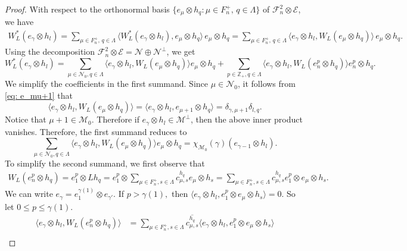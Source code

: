 \documentclass[12pt]{amsart}
\theoremstyle{definition}
\theoremstyle{remark}
\def \Z{\mathbb{Z}}
\newcommand{\cle}{\mathcal{E}}
\newcommand{\clm}{\mathcal{M}}
\newcommand{\cln}{\mathcal{N}}
\newcommand{\clf}{\mathcal{F}}
\newcommand{\ol}{\overline}
\numberwithin{equation}{section}
\begin{document}
\begin{proof}
With respect to the orthonormal basis $\{e_\mu \otimes h_q : \mu \in F_n^+,\, q \in \Lambda\}$
of
$\clf_n^2 \otimes \cle$, we have
\begin{align*}
W_L^*(e_\gamma \otimes h_l)
=
\sum_{\mu \in F_n^+,\, q \in \Lambda}
\langle W_L^*(e_\gamma \otimes h_l),
e_\mu \otimes h_q \rangle
\, e_\mu \otimes h_q 
=
\sum_{\mu \in F_n^+,\, q \in \Lambda}
\langle e_\gamma \otimes h_l,
W_L(e_\mu \otimes h_q) \rangle
\, e_\mu \otimes h_q.
\end{align*}
Using the decomposition 
$\clf_n^2 \otimes \cle = \cln \oplus \cln^\perp$, 
we get
\begin{equation} \label{eq: adjoint}
   W_L^*(e_\gamma \otimes h_l)
=  \sum_{\mu \in \cln_0 , q \in \Lambda} \langle  e_\gamma \otimes h_l, W_L(e_{\mu} \otimes {h_q}) \rangle e_{\mu} \otimes {h_q} + \sum_{p \in \Z_+ , q \in \Lambda} \langle e_\gamma \otimes h_l,  W_L(e_{n}^p \otimes {h_q}) \rangle e_{n}^p \otimes {h_q}.
\end{equation}
We simplify the coefficients in the first summand. Since \(\mu\in\cln_0\), it follows from \eqref{eq: e_mu+1} that
\[
\langle e_\gamma \otimes h_l, W_L(e_\mu \otimes h_q) \rangle = \langle e_\gamma \otimes h_l, e_{\mu+1} \otimes h_q \rangle = \delta_{\gamma, \mu+1} \delta_{l, q}.
\]
Notice that $\mu+1 \in \clm_0.$ Therefore
if $e_\gamma \otimes h_l \in \clm^\perp$, then the above inner product vanishes. Therefore, the first summand reduces to
\[
\sum_{\mu \in \cln_0 , q \in \Lambda} \langle  e_\gamma \otimes h_l, W_L(e_{\mu} \otimes {h_q}) \rangle e_{\mu} \otimes {h_q}
= \chi_{\clm_0}(\gamma )(e_{\gamma-1} \otimes h_l).
\] 
To simplify the second summand, we first observe that
\begin{align*}
 W_L(e_n^{p} \otimes h_q) 
= e_1^{p} \otimes Lh_q 
 = e_1^{p} \otimes \sum_{\mu \in F_n^+ , s \in \Lambda} c^{h_q}_{\mu,s} e_{\mu}\otimes h_s
= \sum_{\mu \in F_n^+ , s \in \Lambda} c^{h_q}_{\mu,s} e_1^{ p} \otimes  e_{\mu}\otimes h_s.
\end{align*}
We can write $e_{\gamma}= e_1^{\gamma(1)} \otimes e_{\gamma'}.$ If $p > \gamma(1),$ then $\langle e_\gamma \otimes h_l,  e_1^{ p} \otimes  e_{\mu}\otimes h_s \rangle =0.$ So let $0 \leq p \leq \gamma(1).$
\begin{align*}
\langle e_\gamma \otimes h_l,  W_L(e_{n}^p \otimes {h_q}) \rangle
&= \sum_{\mu \in F_n^+ , s \in \Lambda} \ol{c^{h_q}_{\mu,s} } \langle e_\gamma \otimes h_l,  e_1^{ p} \otimes  e_{\mu}\otimes h_s \rangle\\

\end{align*}
\end{proof}
\end{document}
